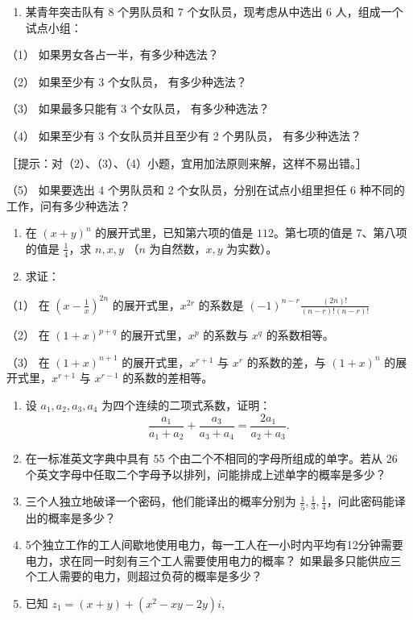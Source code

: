 \begin{enumerate}[start=7]
\item
  某青年突击队有 8 个男队员和 7 个女队员，现考虑从中选出 6
  人，组成一个试点小组：
\end{enumerate}

（1） 如果男女各占一半，有多少种选法？

（2） 如果至少有 3 个女队员， 有多少种选法？

（3） 如果最多只能有 3 个女队员， 有多少种选法？

（4） 如果至少有 3 个女队员并且至少有 2 个男队员， 有多少种选法？

［提示：对（2）、（3）、（4）小题，宜用加法原则来解，这样不易出错。］

（5） 如果要选出 4 个男队员和 2 个女队员，分别在试点小组里担任 6
种不同的工作，问有多少种选法？

\begin{enumerate}[start=8]
\item
  在 \((x + y)^n\) 的展开式里，已知第六项的值是 \(112\)。第七项的值是
  7、第八项的值是 \(\frac{1}{4}\)，求 \(n, x, y\) （\(n\)
  为自然数，\(x, y\) 为实数）。
\item
  求证：
\end{enumerate}

（1） 在 \(\left(x - \frac{1}{x}\right)^{2n}\) 的展开式里，\(x^{2r}\)
的系数是 \((-1)^{n - r} \frac{(2n)!}{(n - r)! (n - r)!}\)

（2） 在 \((1 + x)^{p + q}\) 的展开式里，\(x^p\) 的系数与 \(x^q\)
的系数相等。

（3） 在 \((1 + x)^{n + 1}\) 的展开式里，\(x^{r + 1}\) 与 \(x^r\)
的系数的差，与 \((1 + x)^n\) 的展开式里，\(x^{r + 1}\) 与 \(x^{r - 1}\)
的系数的差相等。

\begin{enumerate}[start=10]
\item
  设 \(a_1, a_2, a_3, a_4\) 为四个连续的二项式系数，证明：
\[
\frac {a _ {1}}{a _ {1} + a _ {2}} + \frac {a _ {3}}{a _ {3} + a _ {4}} = \frac {2 a _ {1}}{a _ {2} + a _ {3}}.
\]
\item
  在一标准英文字典中具有 55 个由二个不相同的字母所组成的单字。若从 26
  个英文字母中任取二个字母予以排列，问能排成上述单字的概率是多少？
\item
  三个人独立地破译一个密码，他们能译出的概率分别为
  \(\frac{1}{5}, \frac{1}{3}, \frac{1}{4}\)，问此密码能译出的概率是多少？
\item
  5个独立工作的工人间歇地使用电力，每一工人在一小时内平均有12分钟需要电力，求在同一时刻有三个工人需要使用电力的概率？
  如果最多只能供应三个工人需要的电力，则超过负荷的概率是多少？
\item
  已知 \(z_{1} = (x + y) + (x^{2} - xy - 2y)i,\)
\end{enumerate}

